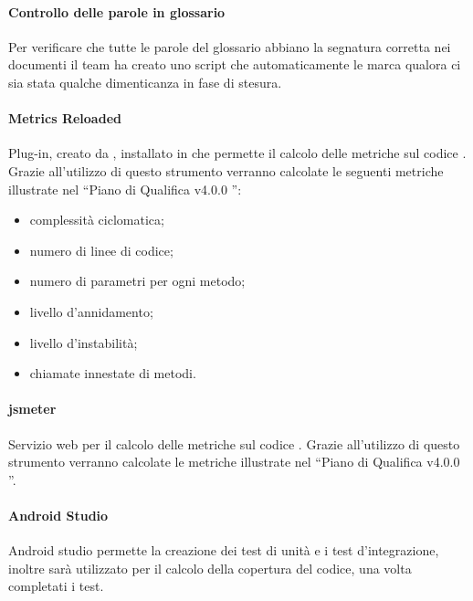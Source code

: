 \paragraph{Controllo delle parole in glossario}
Per verificare che tutte le parole del glossario abbiano la segnatura corretta nei documenti il team ha creato uno script che automaticamente le marca qualora ci sia stata qualche dimenticanza in fase di stesura.

\paragraph{Metrics Reloaded}
Plug-in, creato da , installato in  che permette il calcolo delle metriche sul codice . Grazie all'utilizzo di questo strumento verranno calcolate le seguenti metriche illustrate nel “Piano di Qualifica v4.0.0 ”:
\begin{itemize}
	\item complessità ciclomatica;
	\item numero di linee di codice;
	\item numero di parametri per ogni metodo;
	\item livello d'annidamento;
	\item livello d'instabilità;
	\item chiamate innestate di metodi.
\end{itemize}

\paragraph{jsmeter}
Servizio web per il calcolo delle metriche sul codice . Grazie all'utilizzo di questo strumento verranno calcolate le metriche illustrate nel “Piano di Qualifica v4.0.0 ”.

\paragraph{Android Studio}
Android studio permette la creazione dei test di unità e i test d'integrazione, inoltre sarà utilizzato per il calcolo della copertura del codice, una volta completati i test.
